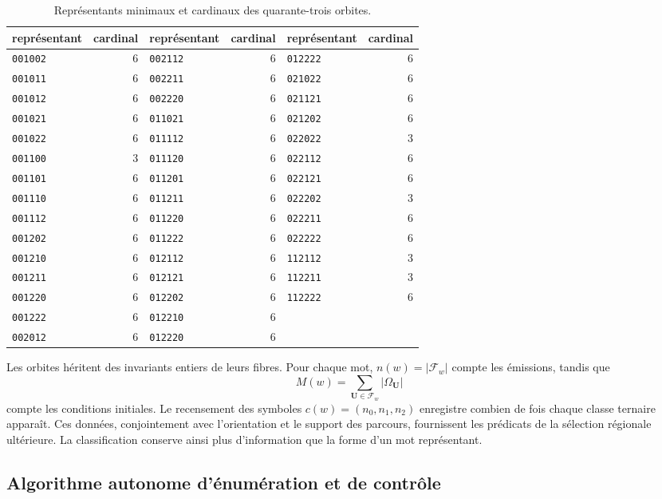\begin{table}[htbp]
\caption{Représentants minimaux et cardinaux des quarante-trois orbites.}
\label{act21:tpk:representantes}
\small
\begin{tabular}{@{}lr@{\qquad}lr@{\qquad}lr@{}}
\toprule
représentant&cardinal&représentant&cardinal&représentant&cardinal\\
\midrule
\texttt{001002}&6&\texttt{002112}&6&\texttt{012222}&6\\
\texttt{001011}&6&\texttt{002211}&6&\texttt{021022}&6\\
\texttt{001012}&6&\texttt{002220}&6&\texttt{021121}&6\\
\texttt{001021}&6&\texttt{011021}&6&\texttt{021202}&6\\
\texttt{001022}&6&\texttt{011112}&6&\texttt{022022}&3\\
\texttt{001100}&3&\texttt{011120}&6&\texttt{022112}&6\\
\texttt{001101}&6&\texttt{011201}&6&\texttt{022121}&6\\
\texttt{001110}&6&\texttt{011211}&6&\texttt{022202}&3\\
\texttt{001112}&6&\texttt{011220}&6&\texttt{022211}&6\\
\texttt{001202}&6&\texttt{011222}&6&\texttt{022222}&6\\
\texttt{001210}&6&\texttt{012112}&6&\texttt{112112}&3\\
\texttt{001211}&6&\texttt{012121}&6&\texttt{112211}&3\\
\texttt{001220}&6&\texttt{012202}&6&\texttt{112222}&6\\
\texttt{001222}&6&\texttt{012210}&6&&\\
\texttt{002012}&6&\texttt{012220}&6&&\\
\bottomrule
\end{tabular}
\end{table}

Les orbites héritent des invariants entiers de leurs fibres. Pour chaque mot,
\(n(w)=|\mathcal F_w|\) compte les émissions, tandis que
\[
 M(w)=\sum_{\mathbf U\in\mathcal F_w}|\Omega_{\mathbf U}|
\]
compte les conditions initiales. Le recensement des symboles
\(c(w)=(n_0,n_1,n_2)\) enregistre combien de fois chaque classe ternaire apparaît.
Ces données, conjointement avec l'orientation et le support des parcours,
fournissent les prédicats de la sélection régionale ultérieure. La
classification conserve ainsi plus d'information que la forme d'un mot
représentant.

\subsection{Algorithme autonome d'énumération et de contrôle}
\label{act21:tpk:algoritmo}

